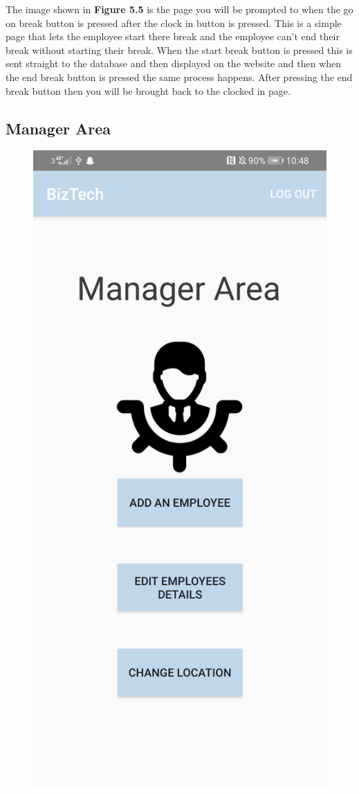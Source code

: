 The image shown in \textbf{Figure 5.5} is the page you will be prompted to when the go on break button is pressed after the clock in button is pressed. This is a simple page that lets the employee start there break and the employee can't end their break without starting their break. When the start break button is pressed this is sent straight to the database and then displayed on the website and then when the end break button is pressed the same process happens. After pressing the end break button then you will be brought back to the clocked in page.
\FloatBarrier

\subsection{Manager Area}
\begin{figure}[!htb]
    \centering
    \includegraphics[scale=0.15]{img/ManagerAreaPage.jpg}

\end{figure}
